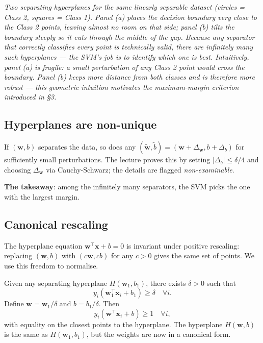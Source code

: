 \documentclass[11pt, a4paper]{article}
\begin{document}
\begin{center}

\footnotesize\textit{Two separating hyperplanes for the same linearly separable dataset (circles = Class 2, squares = Class 1). Panel (a) places the decision boundary very close to the Class 2 points, leaving almost no room on that side; panel (b) tilts the boundary steeply so it cuts through the middle of the gap. Because any separator that correctly classifies every point is technically valid, there are infinitely many such hyperplanes --- the SVM's job is to identify which one is \emph{best}. Intuitively, panel (a) is fragile: a small perturbation of any Class 2 point would cross the boundary. Panel (b) keeps more distance from both classes and is therefore more robust --- this geometric intuition motivates the maximum-margin criterion introduced in \S3.}
\end{center}

\subsection{Hyperplanes are non-unique}

If $(\mathbf{w}, b)$ separates the data, so does any $(\tilde{\mathbf{w}}, \tilde b) = (\mathbf{w} + \Delta_\mathbf{w}, b + \Delta_b)$ for sufficiently small perturbations. The lecture proves this by setting $|\Delta_b| \le \delta/4$ and choosing $\Delta_\mathbf{w}$ via Cauchy-Schwarz; the details are flagged \emph{non-examinable}.

\textbf{The takeaway}: among the infinitely many separators, the SVM picks the one with the largest margin.

\subsection{Canonical rescaling}

The hyperplane equation $\mathbf{w}^\top\mathbf{x} + b = 0$ is invariant under positive rescaling: replacing $(\mathbf{w}, b)$ with $(c\mathbf{w}, cb)$ for any $c > 0$ gives the same set of points. We use this freedom to normalise.

\begin{defbox}
Given any separating hyperplane $H(\mathbf{w}_1, b_1)$, there exists $\delta > 0$ such that
\[
y_i(\mathbf{w}_1^\top\mathbf{x}_i + b_1) \ge \delta \quad \forall i.
\]
Define $\mathbf{w} = \mathbf{w}_1/\delta$ and $b = b_1/\delta$. Then
\[
y_i(\mathbf{w}^\top\mathbf{x}_i + b) \ge 1 \quad \forall i,
\]
with equality on the closest points to the hyperplane. The hyperplane $H(\mathbf{w}, b)$ is the same as $H(\mathbf{w}_1, b_1)$, but the weights are now in a canonical form.
\end{defbox}
\end{document}
